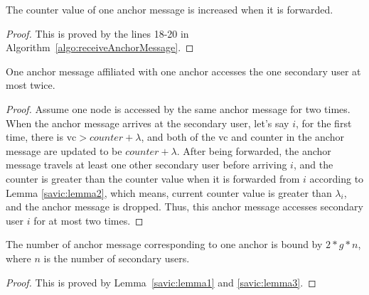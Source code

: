 \begin{lemma}
\label{savic:lemma2}
The counter value of one anchor message is increased when it is forwarded.
\end{lemma}
\begin{proof}
This is proved by the lines 18-20 in Algorithm~\ref{algo:receiveAnchorMessage}.
\end{proof}

\begin{lemma}
\label{savic:lemma3}
One anchor message affiliated with one anchor accesses the one secondary user at most twice.
\end{lemma}
\begin{proof}
Assume one node is accessed by the same anchor message for two times.
When the anchor message arrives at the secondary user, let's say $i$, for the first time, there is $\text{vc} > counter+\lambda$, and both of the vc and counter in the anchor message are updated to be $counter+\lambda$.
After being forwarded, the anchor message travels at least one other secondary user before arriving $i$, and the counter is greater than the counter value when it is forwarded from $i$ according to Lemma \ref{savic:lemma2}, which means, current counter value is greater than $\lambda_i$, and the anchor message is dropped.
Thus, this anchor message accesses secondary user $i$ for at most two times.
\end{proof}

\begin{theorem}
\label{savic:theorem_anchorMsg}
The number of anchor message corresponding to one anchor is bound by $2*g*n$, where $n$ is the number of secondary users.
\end{theorem}
\begin{proof}
This is proved by Lemma~\ref{savic:lemma1} and \ref{savic:lemma3}.
\end{proof}

